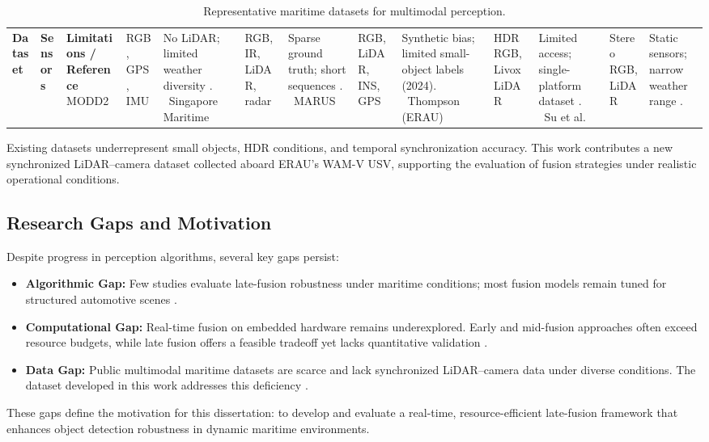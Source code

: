 \begin{table}[htbp]
\centering
\caption{Representative maritime datasets for multimodal perception.}
\label{table:maritime_datasets_short}
\small
\begin{tabular}{p{3cm} p{5cm} p{6cm}}
\hline
\textbf{Dataset} & \textbf{Sensors} & \textbf{Limitations / Reference} \
\hline\hline
MODD2 & RGB, GPS, IMU & No LiDAR; limited weather diversity \cite{bovcon2020}. \
Singapore Maritime & RGB, IR, LiDAR, radar & Sparse ground truth; short sequences \cite{jun-hwa2022}. \
MARUS & RGB, LiDAR, INS, GPS & Synthetic bias; limited small-object labels (2024). \
Thompson (ERAU) & HDR RGB, Livox LiDAR & Limited access; single-platform dataset \cite{thompson2023}. \
Su et al. & Stereo RGB, LiDAR & Static sensors; narrow weather range \cite{su2023}. \
\hline
\end{tabular}
\end{table}

Existing datasets underrepresent small objects, HDR conditions, and temporal synchronization accuracy. This work contributes a new synchronized LiDAR–camera dataset collected aboard ERAU’s WAM-V USV, supporting the evaluation of fusion strategies under realistic operational conditions.

\subsection{Research Gaps and Motivation}
Despite progress in perception algorithms, several key gaps persist:

\begin{itemize}
\item \textbf{Algorithmic Gap:} Few studies evaluate late-fusion robustness under maritime conditions; most fusion models remain tuned for structured automotive scenes \cite{liang2022, xu2023, qi2021}.
\item \textbf{Computational Gap:} Real-time fusion on embedded hardware remains underexplored. Early and mid-fusion approaches often exceed resource budgets, while late fusion offers a feasible tradeoff yet lacks quantitative validation \cite{bai2022, li2022deepfusion}.
\item \textbf{Data Gap:} Public multimodal maritime datasets are scarce and lack synchronized LiDAR–camera data under diverse conditions. The dataset developed in this work addresses this deficiency \cite{thompson2023, su2023}.
\end{itemize}

These gaps define the motivation for this dissertation: to develop and evaluate a real-time, resource-efficient late-fusion framework that enhances object detection robustness in dynamic maritime environments.